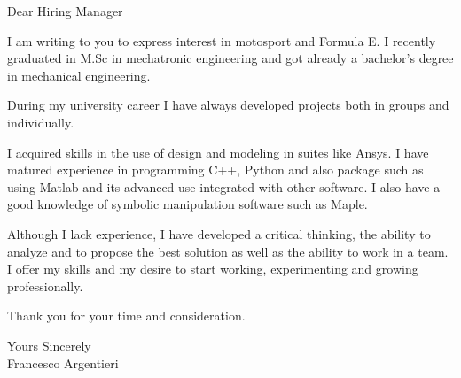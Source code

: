 \documentclass[a4paper,english]{friggeri-letter}
\begin{document}
\address{
   Circonvallazione Istoniense, 20 \\
   Vasto (CH), 66054 \\
   Italy
}



\opening{Dear Hiring Manager}

I am writing to you to express interest in motosport and Formula E.
I recently graduated in M.Sc in mechatronic engineering and got already a bachelor's degree in mechanical engineering.

During my university career I have always developed projects both in groups and individually.

I acquired skills in the use of design and modeling in suites like Ansys. I have matured experience in programming C++, Python and also package such as using Matlab and its advanced use integrated with other software.
I also have a good knowledge of symbolic manipulation software such as Maple. 

Although I lack experience, I have developed a critical thinking, the ability to analyze and to propose the best solution as well as the ability to work in a team. 
I offer my skills and my desire to start working, experimenting and growing professionally.

Thank you for your time and consideration.

\closing{
   Yours Sincerely\\
   Francesco Argentieri}
\end{document}
